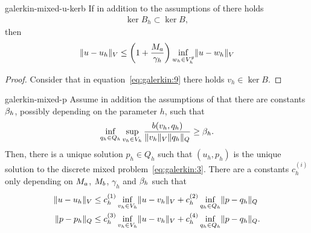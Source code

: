 \begin{Corollary}{galerkin-mixed-u-kerb}
  If in addition to the assumptions of
   there holds
  \begin{gather}
    \label{eq:galerkin:6}
    \ker{B_h}\subset \ker B,
  \end{gather}
  then
  \begin{gather}
    \label{eq:galerkin:7}
    \lVert u-u_h\rVert_V \le \left(1+\frac{M_a}{\gamma_h}\right)
    \inf_{w_h\in V_h^g}\lVert u-w_h\rVert_V
  \end{gather}
\end{Corollary}

\begin{proof}
  Consider that in equation~\eqref{eq:galerkin:9} there holds
  $v_h\in\ker B$.
\end{proof}

\begin{Theorem}{galerkin-mixed-p}
  Assume in addition the assumptions of
   that there are constants
  $\beta_h$, possibly depending on the parameter $h$, such that
  \begin{gather}
    \label{eq:galerkin:10}
    \inf_{q_h\in Q_h} \sup_{v_h\in V_h}
    \frac{b(v_h, q_h)}{\lVert v_h\rVert_V\lVert q_h\rVert_Q}
    \ge \beta_h.
  \end{gather}
  Then, there is a unique solution $p_h\in Q_h$ such that $(u_h, p_h)$
  is the unique solution to the discrete mixed
  problem~\eqref{eq:galerkin:3}. There are a constants $c_h^{(i)}$
  only depending on $M_a$, $M_b$, $\gamma_h$ and $\beta_h$
  such that
  \begin{align}
    \label{eq:galerkin:11}
    \lVert u-u_h\rVert_V
    &\le c_h^{(1)} \inf_{v_h\in V_h}\lVert u-v_h\rVert_V
    + c_h^{(2)} \inf_{q_h\in Q_h}\lVert p-q_h\rVert_Q \\
    \lVert p-p_h\rVert_Q
    &\le c_h^{(3)} \inf_{v_h\in V_h}\lVert u-v_h\rVert_V
    + c_h^{(4)} \inf_{q_h\in Q_h}\lVert p-q_h\rVert_Q.
  \end{align}
\end{Theorem}

